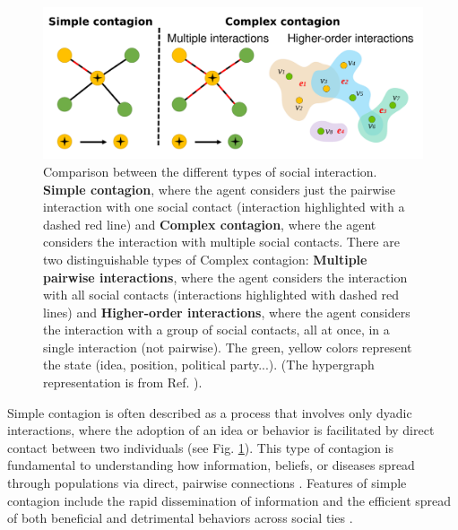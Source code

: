 \begin{figure}
    \centering
    \captionsetup{font=sf}
    \includegraphics[width=\textwidth]{Figs/Introduction/complex_simple.pdf}
    \caption[Simple and complex contagion processes]{Comparison between the different types of social interaction. {\bfseries Simple contagion}, where the agent considers just the pairwise interaction with one social contact (interaction highlighted with a dashed red line) and {\bfseries Complex contagion}, where the agent considers the interaction with multiple social contacts. There are two distinguishable types of Complex contagion: {\bfseries Multiple pairwise interactions}, where the agent considers the interaction with all social contacts (interactions highlighted with dashed red lines) and {\bfseries Higher-order interactions}, where the agent considers the interaction with a group of social contacts, all at once, in a single interaction (not pairwise). The green, yellow colors represent the state (idea, position, political party...). (The hypergraph representation is from Ref. \cite{de-arruda-2020}).}
    \label{fig:SimpleComplexContagion}
\end{figure}

Simple contagion is often described as a process that involves only dyadic interactions, where the adoption of an idea or behavior is facilitated by direct contact between two individuals (see Fig. \ref{fig:SimpleComplexContagion}). This type of contagion is fundamental to understanding how information, beliefs, or diseases spread through populations via direct, pairwise connections \cite{pastor2001epidemic, newman2002spread}. Features of simple contagion include the rapid dissemination of information and the efficient spread of both beneficial and detrimental behaviors across social ties \cite{christakis2007spread, fowler2009cooperative}.

